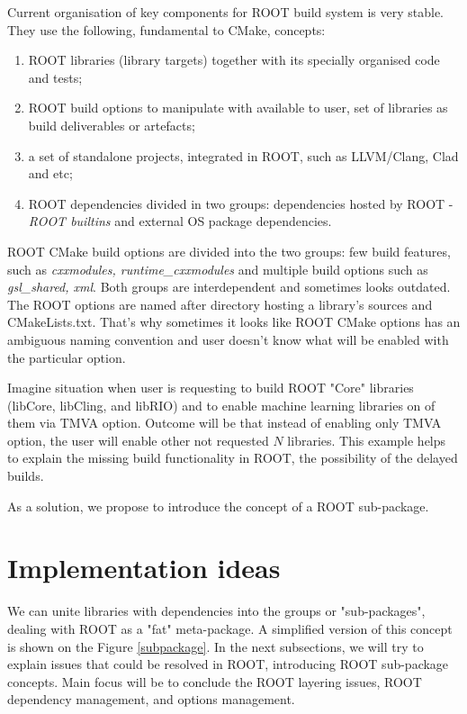 \documentclass[12pt]{iopart}
\begin{document}
Current organisation of key components for ROOT build system is very stable. They use the following, fundamental to CMake, concepts:
\begin{enumerate}
    \item ROOT libraries (library targets) together with its specially organised code and tests;
    \item ROOT build options to manipulate with available to user, set of libraries as build deliverables or artefacts;
    \item a set of standalone projects, integrated in ROOT, such as LLVM/Clang, Clad and etc;
    \item ROOT dependencies divided in two groups: dependencies  hosted by ROOT - \textit{ROOT builtins} and external OS package dependencies.
\end{enumerate}

ROOT CMake build options are divided into the two groups: few build features, such as \textit{cxxmodules, runtime\_cxxmodules} and multiple build options such as \textit{gsl\_shared, xml}. Both groups are interdependent and sometimes looks outdated. The ROOT options are named after directory hosting a library's sources and CMakeLists.txt. That's why sometimes it looks like ROOT CMake options has an ambiguous naming convention and user doesn't know what will be enabled with the particular option. 

Imagine situation when user is requesting to build ROOT "Core" libraries (libCore, libCling, and libRIO) and to enable machine learning libraries on of them via TMVA option. Outcome will be that instead of enabling only TMVA option, the user will enable other not requested $N$ libraries. This example helps to explain the missing build functionality in ROOT, the possibility of the delayed builds.

As a solution, we propose to introduce the concept of a ROOT sub-package.

\section{Implementation ideas}

We can unite libraries with dependencies into the groups or "sub-packages", dealing with ROOT as a "fat" meta-package. A simplified version of this concept is shown on the Figure \ref{subpackage}. In the next subsections, we will try to explain issues that could be resolved in ROOT, introducing ROOT sub-package concepts. Main focus will be to conclude the ROOT layering issues, ROOT dependency management, and options management.
\end{document}

